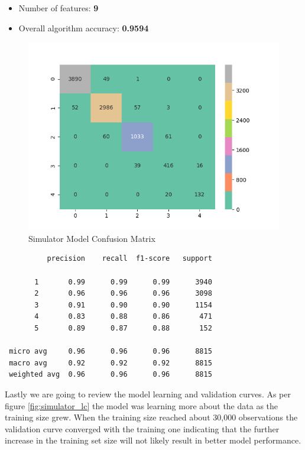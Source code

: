 \begin{itemize}
\tightlist
\item
  Number of features: \textbf{9}
\item
  Overall algorithm accuracy: \textbf{0.9594}
\end{itemize}

\begin{Schunk}
\begin{figure}[H]

{\centering \includegraphics[width=0.9\linewidth]{../../models/training/simulator_rf_tuned_large_matrix} 

}

\caption[Simulator Model Confusion Matrix]{Simulator Model Confusion Matrix}\label{fig:simulator_cm}
\end{figure}
\end{Schunk}

\begin{verbatim}
          precision    recall  f1-score   support

       1       0.99      0.99      0.99      3940
       2       0.96      0.96      0.96      3098
       3       0.91      0.90      0.90      1154
       4       0.83      0.88      0.86       471
       5       0.89      0.87      0.88       152

 micro avg     0.96      0.96      0.96      8815
 macro avg     0.92      0.92      0.92      8815
 weighted avg  0.96      0.96      0.96      8815
\end{verbatim}

Lastly we are going to review the model learning and validation curves.
As per figure \ref{fig:simulator_lc} the model was learning more about
the data as the training size grew. When the training size reached about
30,000 observations the validation curve converged with the training one
indicating that the further increase in the training set size will not
likely result in better model performance.

